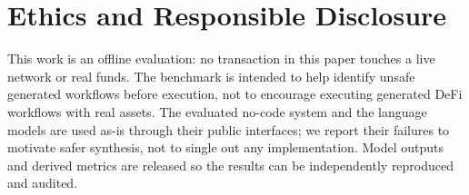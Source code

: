 \section{Ethics and Responsible Disclosure}
\label{sec:ethics}

This work is an offline evaluation: no transaction in this paper touches
a live network or real funds. The benchmark is intended to help identify
unsafe generated workflows before execution, not to encourage executing
generated DeFi workflows with real assets. The evaluated no-code system
and the language models are used as-is through their public interfaces;
we report their failures to motivate safer synthesis, not to single out
any implementation. Model outputs and derived metrics are released so
the results can be independently reproduced and audited.
